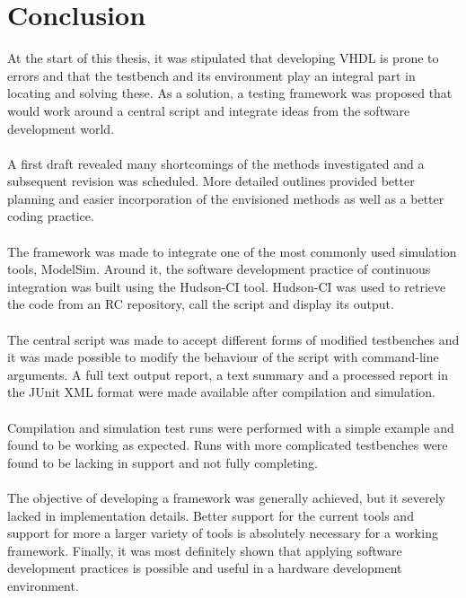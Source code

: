\documentclass[11pt,british]{article}
\begin{document}
\section{Conclusion}
At the start of this thesis, it was stipulated that developing \gls{VHDL} is prone to errors and that the testbench and its environment play an integral part in locating and solving these. As a solution, a testing framework was proposed that would work around a central script and integrate ideas from the software development world.
\\
\\
A first draft revealed many shortcomings of the methods investigated and a subsequent revision was scheduled. More detailed outlines provided better planning and easier incorporation of the envisioned methods as well as a better coding practice.
\\
\\
The framework was made to integrate one of the most commonly used simulation tools, ModelSim. Around it, the software development practice of continuous integration was built using the Hudson-CI tool. Hudson-CI was used to retrieve the code from an RC repository, call the script and display its output.
\\
\\
The central script was made to accept different forms of modified testbenches and it was made possible to modify the behaviour of the script with command-line arguments. A full text output report, a text summary and a processed report in the JUnit XML format were made available after compilation and simulation.
\\
\\
Compilation and simulation test runs were performed with a simple example and found to be working as expected. Runs with more complicated testbenches were found to be lacking in support and not fully completing.
\\
\\
The objective of developing a framework was generally achieved, but it severely lacked in implementation details. Better support for the current tools and support for more a larger variety of tools is absolutely necessary for a working framework. Finally, it was most definitely shown that applying software development practices is possible and useful in a hardware development environment.

\pagebreak{}

\printbibliography[heading=bibintoc]
\end{document}
